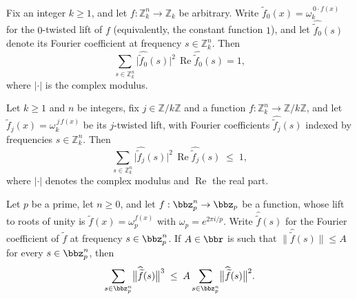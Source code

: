 \begin{lemma}
\label{ZkBLR.lift_omega_j_zero_contribution}
\leanok
{}
Fix an integer $k \ge 1$, and let $f : \mathbb{Z}_k^n \to \mathbb{Z}_k$ be arbitrary.
Write $\widetilde{f}_0(x) = \omega_k^{\,0 \cdot f(x)}$ for the $0$-twisted lift of $f$
(equivalently, the constant function $1$), and let $\widehat{\widetilde{f}_0}(s)$ denote
its Fourier coefficient at frequency $s \in \mathbb{Z}_k^n$. Then
\[
  \sum_{s \in \mathbb{Z}_k^n}
    \bigl|\widehat{\widetilde{f}_0}(s)\bigr|^2 \,
    \operatorname{Re}\widehat{\widetilde{f}_0}(s) = 1,
\]
where $|\cdot|$ is the complex modulus.
\end{lemma}

\begin{lemma}
\label{ZkBLR.weighted_fourier_sum_le_one}
\leanok
{}
Let $k \ge 1$ and $n$ be integers, fix $j \in \mathbb{Z}/k\mathbb{Z}$ and a function $f
: \mathbb{Z}_k^n \to \mathbb{Z}/k\mathbb{Z}$, and let $\widetilde{f}_j(x) =
\omega_k^{\,j\,f(x)}$ be its $j$-twisted lift, with Fourier coefficients
$\widehat{\widetilde{f}_j}(s)$ indexed by frequencies $s \in \mathbb{Z}_k^n$. Then
\[
  \sum_{s \in \mathbb{Z}_k^n}
    \bigl\lvert \widehat{\widetilde{f}_j}(s) \bigr\rvert^{2}\,
    \operatorname{Re}\widehat{\widetilde{f}_j}(s)
  \;\le\; 1,
\]
where $\lvert\cdot\rvert$ denotes the complex modulus and $\operatorname{Re}$ the real
part.
\end{lemma}

\begin{lemma}
\label{ZkBLR.cube_sum_bound_by_max}
\leanok
{}
Let $p$ be a prime, let $n \ge 0$, and let $f : \bbz_p^n \to \bbz_p$ be a function,
whose lift to roots of unity is $\widetilde{f}(x) = \omega_p^{f(x)}$ with $\omega_p =
e^{2\pi i/p}$. Write $\widehat{\widetilde{f}}(s)$ for the Fourier coefficient of
$\widetilde{f}$ at frequency $s \in \bbz_p^n$. If $A \in \bbr$ is such that
$\bigl\|\widehat{\widetilde{f}}(s)\bigr\| \le A$ for every $s \in \bbz_p^n$, then
\[
  \sum_{s \in \bbz_p^n} \bigl\|\widehat{\widetilde{f}}(s)\bigr\|^3
  \;\le\;
  A \sum_{s \in \bbz_p^n} \bigl\|\widehat{\widetilde{f}}(s)\bigr\|^2.
\]
\end{lemma}

